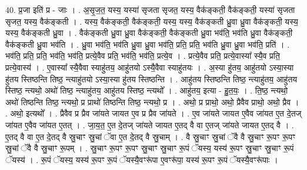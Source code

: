 \documentclass[17pt]{extarticle}
\begin{document}
40. प्र॒जा इति॑ प्र - जाः । . अ॒सृ॒ज॒त॒ यस्य॒ यस्या॑ सृजता सृजत॒ यस्य॒ वैक॑ङ्कती॒ वैक॑ङ्कती॒ यस्या॑ सृजता सृजत॒ यस्य॒ वैक॑ङ्कती । . यस्य॒ वैक॑ङ्कती॒ वैक॑ङ्कती॒ यस्य॒ यस्य॒ वैक॑ङ्कती ध्रु॒वा ध्रु॒वा वैक॑ङ्कती॒ यस्य॒ यस्य॒ वैक॑ङ्कती ध्रु॒वा । . वैक॑ङ्कती ध्रु॒वा ध्रु॒वा वैक॑ङ्कती॒ वैक॑ङ्कती ध्रु॒वा भव॑ति॒ भव॑ति ध्रु॒वा वैक॑ङ्कती॒ वैक॑ङ्कती ध्रु॒वा भव॑ति । . ध्रु॒वा भव॑ति॒ भव॑ति ध्रु॒वा ध्रु॒वा भव॑ति॒ प्रति॒ प्रति॒ भव॑ति ध्रु॒वा ध्रु॒वा भव॑ति॒ प्रति॑ । . भव॑ति॒ प्रति॒ प्रति॒ भव॑ति॒ भव॑ति॒ प्रत्ये॒वैव प्रति॒ भव॑ति॒ भव॑ति॒ प्रत्ये॒व । . प्रत्ये॒वैव प्रति॒ प्रत्ये॒वास्या᳚ स्यै॒व प्रति॒ प्रत्ये॒वास्य॑ । . ए॒वास्या᳚ स्यै॒वैवा स्याहु॑तय॒ आहु॑तयो ऽस्यै॒वैवा स्याहु॑तयः । . अ॒स्या हु॑तय॒ आहु॑तयो ऽस्या॒स्या हु॑तय स्तिष्ठन्ति तिष्ठ॒ न्त्याहु॑तयो ऽस्या॒स्या हु॑तय स्तिष्ठन्ति । . आहु॑तय स्तिष्ठन्ति तिष्ठ॒ न्त्याहु॑तय॒ आहु॑तय स्तिष्ठ॒ न्त्यथो॒ अथो॑ तिष्ठ॒ न्त्याहु॑तय॒ आहु॑तय स्तिष्ठ॒ न्त्यथो᳚ । . आहु॑तय॒ इत्या - हु॒त॒यः॒ । . ति॒ष्ठ॒ न्त्यथो॒ अथो॑ तिष्ठन्ति तिष्ठ॒ न्त्यथो॒ प्र प्राथो॑ तिष्ठन्ति तिष्ठ॒ न्त्यथो॒ प्र । . अथो॒ प्र प्राथो॒ अथो॒ प्रैवैव प्राथो॒ अथो॒ प्रैव । . अथो॒ इत्यथो᳚ । . प्रैवैव प्र प्रैव जा॑यते जायत ए॒व प्र प्रैव जा॑यते । . ए॒व जा॑यते जायत ए॒वैव जा॑यत ए॒त दे॒तज् जा॑यत ए॒वैव जा॑यत ए॒तत् । . जा॒य॒त॒ ए॒त दे॒तज् जा॑यते जायत ए॒तद् वै वा ए॒तज् जा॑यते जायत ए॒तद् वै । . ए॒तद् वै वा ए॒त दे॒तद् वै स्रु॒चाꣳ स्रु॒चां ॅवा ए॒त दे॒तद् वै स्रु॒चाम् । . वै स्रु॒चाꣳ स्रु॒चां ॅवै वै स्रु॒चाꣳ रू॒पꣳ रू॒पꣳ स्रु॒चां ॅवै वै स्रु॒चाꣳ रू॒पम् । . स्रु॒चाꣳ रू॒पꣳ रू॒पꣳ स्रु॒चाꣳ स्रु॒चाꣳ रू॒पं ॅयस्य॒ यस्य॑ रू॒पꣳ स्रु॒चाꣳ स्रु॒चाꣳ रू॒पं ॅयस्य॑ । . रू॒पं ॅयस्य॒ यस्य॑ रू॒पꣳ रू॒पं ॅयस्यै॒वꣳरू॑पा ए॒वꣳरू॑पा॒ यस्य॑ रू॒पꣳ रू॒पं ॅयस्यै॒वꣳरू॑पाः । \newline
\end{document}
